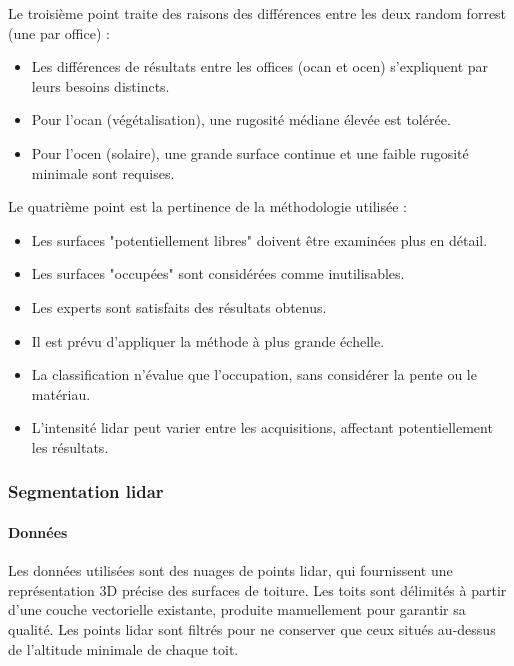 \par{Le troisième point traite des raisons des différences entre les deux random forrest (une par office) :}
\begin{itemize}
    \item Les différences de résultats entre les offices (\acrshort{ocan} et \acrshort{ocen}) s'expliquent par leurs besoins distincts.
    \item Pour l'\acrshort{ocan} (végétalisation), une rugosité médiane élevée est tolérée.
    \item Pour l'\acrshort{ocen} (solaire), une grande surface continue et une faible rugosité minimale sont requises.
\end{itemize}

\par{Le quatrième point est la pertinence de la méthodologie utilisée :}
\begin{itemize}
    \item Les surfaces "potentiellement libres" doivent être examinées plus en détail.
    \item Les surfaces "occupées" sont considérées comme inutilisables.
    \item Les experts sont satisfaits des résultats obtenus.
    \item Il est prévu d'appliquer la méthode à plus grande échelle.
    \item La classification n'évalue que l'occupation, sans considérer la pente ou le matériau.
    \item L'intensité \gls{lidar} peut varier entre les acquisitions, affectant potentiellement les résultats.
\end{itemize}

\subsubsection{Segmentation \gls{lidar}}

\paragraph{Données}
\par{Les données utilisées sont des nuages de points \gls{lidar}, qui fournissent une représentation 3D précise des surfaces de toiture. Les toits sont délimités à partir d'une couche vectorielle existante, produite manuellement pour garantir sa qualité. Les points \gls{lidar} sont filtrés pour ne conserver que ceux situés au-dessus de l'altitude minimale de chaque toit.}


